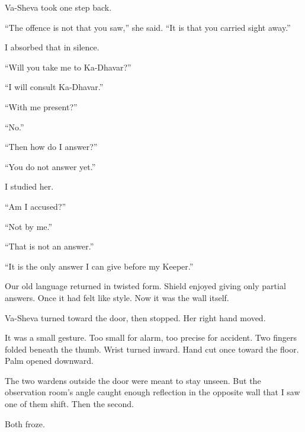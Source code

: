 Va-Sheva took one step back.\par

``The offence is not that you saw,'' she said. ``It is that you carried sight away.''\par

I absorbed that in silence.\par

``Will you take me to Ka-Dhavar?''\par

``I will consult Ka-Dhavar.''\par

``With me present?''\par

``No.''\par

``Then how do I answer?''\par

``You do not answer yet.''\par

I studied her.\par

``Am I accused?''\par

``Not by me.''\par

``That is not an answer.''\par

``It is the only answer I can give before my Keeper.''\par

Our old language returned in twisted form. Shield enjoyed giving only partial answers. Once it had felt like style. Now it was the wall itself.\par

Va-Sheva turned toward the door, then stopped. Her right hand moved.\par

It was a small gesture. Too small for alarm, too precise for accident. Two fingers folded beneath the thumb. Wrist turned inward. Hand cut once toward the floor. Palm opened downward.\par

The two wardens outside the door were meant to stay unseen. But the observation room's angle caught enough reflection in the opposite wall that I saw one of them shift. Then the second.\par

Both froze.\par

